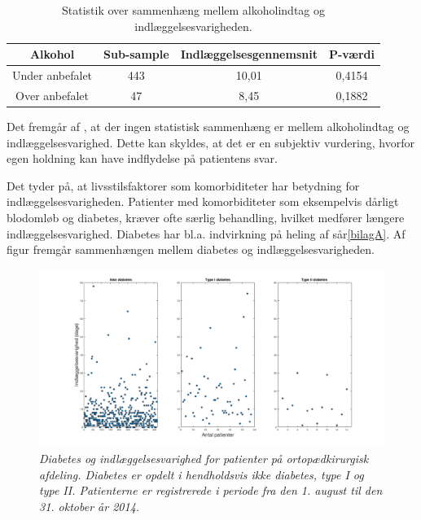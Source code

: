 \begin{table}[H]
\centering
\begin{tabular}{|c|c|c|c|}
\hline
\textbf{Alkohol} & \textbf{Sub-sample} & \textbf{Indlæggelsesgennemsnit} & \textbf{P-værdi} \\ \hline
Under anbefalet   & 443                 & 10,01                           & 0,4154           \\ \hline
Over anbefalet    & 47                  & 8,45                            & 0,1882           \\ \hline
\end{tabular}
\caption{Statistik over sammenhæng mellem alkoholindtag og indlæggelsesvarigheden.}
\label{alkoholindlaegtab}
\end{table}

\noindent
Det fremgår af , at der ingen statistisk sammenhæng er mellem alkoholindtag og indlæggelsesvarighed. Dette kan skyldes, at det er en subjektiv vurdering, hvorfor egen holdning kan have indflydelse på patientens svar. 

Det tyder på, at livsstilsfaktorer som komorbiditeter har betydning for indlæggelsesvarigheden. Patienter med komorbiditeter som eksempelvis dårligt blodomløb og diabetes, kræver ofte særlig behandling, hvilket medfører længere indlæggelsesvarighed. Diabetes har bl.a. indvirkning på heling af sår\ref{bilagA}. Af figur  fremgår sammenhængen mellem diabetes og indlæggelsesvarigheden. 

\begin{figure}[H]
	\centering
	\includegraphics[scale=0.25]{figures/diabetesogindlaeg}
	\caption{\textit{Diabetes og indlæggelsesvarighed for patienter på ortopædkirurgisk afdeling. Diabetes er opdelt i hendholdsvis ikke diabetes, type I og type II. Patienterne er registrerede i periode fra den 1. august til den 31. oktober år 2014.}}
	\label{diabetesogindlaeggelse}
\end{figure}

